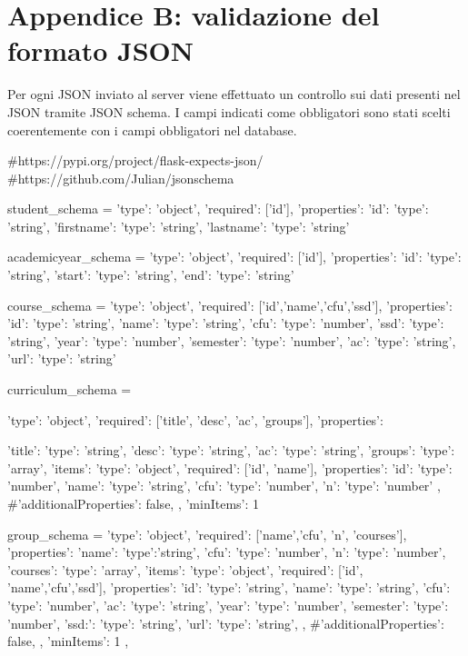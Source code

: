 \documentclass{article}
\begin{document}
\section{Appendice B: validazione del formato JSON}
Per ogni JSON inviato al server viene effettuato un controllo sui dati presenti nel JSON tramite JSON schema. 
I campi indicati come obbligatori sono stati scelti coerentemente con i campi obbligatori nel database.
\begin{python}
#https://pypi.org/project/flask-expects-json/
#https://github.com/Julian/jsonschema

student_schema = {
    'type': 'object',
    'required': ['id'],
    'properties': {
        'id': {'type': 'string'},
        'firstname': {'type': 'string'},
        'lastname': {'type': 'string'}
    }
}

academicyear_schema = {
    'type': 'object',
    'required': ['id'],
    'properties': {
        'id': {'type': 'string'},
        'start': {'type': 'string'},
        'end': {'type': 'string'}
    }
}

course_schema = {
    'type': 'object',
    'required': ['id','name','cfu','ssd'],
    'properties': {
        'id': {'type': 'string'},
        'name': {'type': 'string'},
        'cfu': {'type': 'number'},
        'ssd': {'type': 'string'},
        'year': {'type': 'number'},
        'semester': {'type': 'number'},
        'ac': {'type': 'string'},
        'url': {'type': 'string'}
    }
}

curriculum_schema = {
    'type': 'object',
    'required': ['title', 'desc', 'ac', 'groups'],
    'properties': {
        'title': {'type': 'string'},
        'desc': {'type': 'string'},
        'ac': {'type': 'string'},
        'groups': {
            'type': 'array',
            'items': {
                'type': 'object',
                'required': ['id', 'name'],
                'properties': {
                    'id': {'type': 'number'},
                    'name': {'type': 'string'},
                    'cfu': {'type': 'number'},
                    'n': {'type': 'number'}
                },
                #'additionalProperties': false,
            },
            'minItems': 1
        }

    }
}

group_schema = {
    'type': 'object',
    'required': ['name','cfu', 'n', 'courses'],
    'properties': {
        'name': {'type':'string'},
        'cfu': {'type': 'number'},
        'n': {'type': 'number'},
        'courses': {
            'type': 'array',
            'items': {
                'type': 'object',
                'required': ['id', 'name','cfu','ssd'],
                'properties': {
                    'id': {'type': 'string'},
                    'name': {'type': 'string'},
                    'cfu': {'type': 'number'},
                    'ac': {'type': 'string'},
                    'year': {'type': 'number'},
                    'semester': {'type': 'number'},
                    'ssd:': {'type': 'string'},
                    'url': {'type': 'string'},
                },
                #'additionalProperties': false,
            },
            'minItems': 1
        }
    },
}


\end{python}
\end{document}
